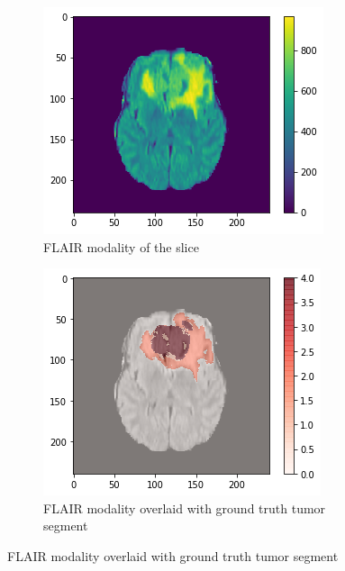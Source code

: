 \begin{figure}[H]
    \centering
    \begin{subfigure}[t]{.32\textwidth}
        \centering
        \includegraphics[width=\linewidth]{chapters/07_brats3d/images/04_flair.png}
        \caption{FLAIR modality of the slice}
    \end{subfigure}\hfill%
    \begin{subfigure}[t]{.315\textwidth}
        \centering
        \includegraphics[width=\linewidth]{chapters/07_brats3d/images/08_flair_segment.png}
        \caption{FLAIR modality overlaid with ground truth tumor segment}

\end{subfigure}
\end{figure}
